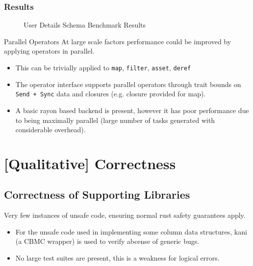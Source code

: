 \subsubsection{Results}
\begin{figure}[h!]
    \centering
    \vspace{-0.4em}
    \resizebox{\textwidth}{!}{}
    \resizebox{\textwidth}{!}{}
    \caption{User Details Schema Benchmark Results}
    \label{fig:sales_analysis_access_queries}
\end{figure}

\begin{futurebox}{Parallel Operators}
    At large scale factors performance could be improved by applying operators in parallel.
    \begin{itemize}
        \setlength\itemsep{0em}
        \item This can be trivially applied to \texttt{map}, \texttt{filter}, \texttt{asset}, \texttt{deref}
        \item The operator interface supports parallel operators through trait bounds on \texttt{Send + Sync} data and closures (e.g. closure provided for map).
        \item A basic rayon\cite{RayonExplainer} based backend is present, however it has poor performance due to being maximally parallel (large number of tasks generated with considerable overhead).
    \end{itemize}
\end{futurebox}

\section{[Qualitative] Correctness}
\subsection{Correctness of Supporting Libraries}
Very few instances of unsafe code, ensuring normal rust safety guarantees apply.
\begin{itemize}
    \setlength\itemsep{0em}
    \item For the unsafe code used in implementing some column data structures, kani\cite{KaniGithub} (a CBMC\cite{DiffBlueCBMC} wrapper) is used to verify abcense of generic bugs.
    \item No large test suites are present, this is a weakness for logical errors.
\end{itemize}

